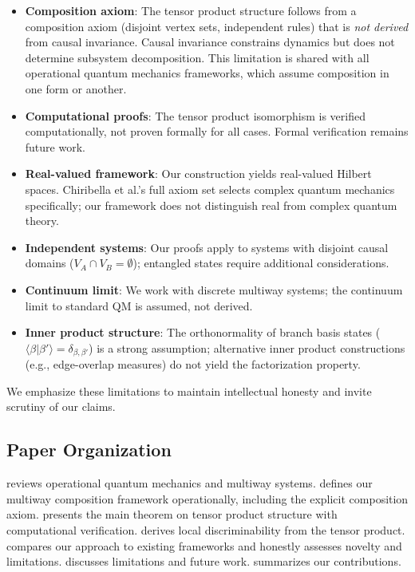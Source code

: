 \documentclass[11pt,a4paper]{article}
\theoremstyle{definition}
\theoremstyle{remark}
\newcommand{\braket}[2]{\langle#1|#2\rangle}
\begin{document}
\begin{itemize}
\item \textbf{Composition axiom}: The tensor product structure follows
  from a composition axiom (disjoint vertex sets, independent rules) that
  is \textit{not derived} from causal invariance. Causal invariance
  constrains dynamics but does not determine subsystem decomposition.
  This limitation is shared with all operational quantum mechanics
  frameworks, which assume composition in one form or another.
\item \textbf{Computational proofs}: The tensor product isomorphism is
  verified computationally, not proven formally for all cases. Formal
  verification remains future work.
\item \textbf{Real-valued framework}: Our construction yields
  real-valued Hilbert spaces. Chiribella et al.'s full axiom set selects
  complex quantum mechanics specifically; our framework does not
  distinguish real from complex quantum theory.
\item \textbf{Independent systems}: Our proofs apply to systems with
  disjoint causal domains ($V_A \cap V_B = \emptyset$); entangled states
  require additional considerations.
\item \textbf{Continuum limit}: We work with discrete multiway systems;
  the continuum limit to standard QM is assumed, not derived.
\item \textbf{Inner product structure}: The orthonormality of branch
  basis states ($\braket{\beta}{\beta'} = \delta_{\beta,\beta'}$) is a
  strong assumption; alternative inner product constructions (e.g.,
  edge-overlap measures) do not yield the factorization property.
\end{itemize}

We emphasize these limitations to maintain intellectual honesty and invite
scrutiny of our claims.

\subsection{Paper Organization}

 reviews operational quantum mechanics and multiway
systems.  defines our multiway composition framework
operationally, including the explicit composition axiom.
 presents the main theorem on tensor product structure
with computational verification.  derives local
discriminability from the tensor product.  compares
our approach to existing frameworks and honestly assesses novelty and
limitations.  discusses limitations and future work.
 summarizes our contributions.
\end{document}
